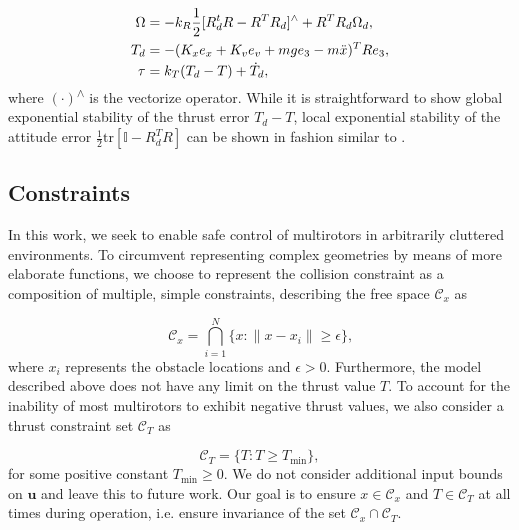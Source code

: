 \small
\begin{subequations}
\begin{align}
    \Omega &= -k_R \frac{1}{2}[R_d^tR - R^T R_d]\textsuperscript{$\wedge$} + R^T R_d \Omega_{d}, \label{lee_attitude}\\
    T_d &= - (K_x e_x + K_v e_v + m g e_3 - m \Ddot{x})^T R e_3,\label{lee_position} \\
    \tau &= k_T (T_d - T) + \dot{T}_d, \label{lee_thrust}
\end{align}
\end{subequations}
\normalsize
where $(\cdot)$\textsuperscript{$\wedge$} is the vectorize operator. While it is straightforward to show global exponential stability of the thrust error $T_d - T$, local exponential stability of the attitude error $ \frac{1}{2}\text{tr}[\mathbb{I} - R_d^T R]$ can be shown in fashion similar to \cite{LeeProof}.

\subsection{Constraints}
In this work, we seek to enable safe control of multirotors in arbitrarily cluttered environments. To circumvent representing complex geometries by means of more elaborate functions, we choose to represent the collision constraint as a composition of multiple, simple constraints, describing the free space $\mathcal{C}_x$ as

\small
\begin{equation}\label{collision_constraint}
    \mathcal{C}_x = \bigcap_{i=1}^{N} \{x : \|x - x_i\| \geq \epsilon\} \text{,}
\end{equation}
\normalsize
where $x_i$ represents the obstacle locations and $\epsilon>0$. Furthermore, the model described above does not have any limit on the thrust value $T$. To account for the inability of most multirotors to exhibit negative thrust values, we also consider a thrust constraint set $\mathcal{C}_T$ as

\small
\begin{equation}\label{thrust_constraint}
    \mathcal{C}_T = \{ T : T \geq T_\text{min} \},
\end{equation}
\normalsize
for some positive constant $T_\text{min}\ge0$.
We do not consider additional input bounds on $\mathbf{u}$ and leave this to future work. Our goal is to ensure $x \in \mathcal{C}_x$ and $T \in \mathcal{C}_T$ at all times during operation, i.e. ensure invariance of the set $\mathcal{C}_x \cap \mathcal{C}_T$.

